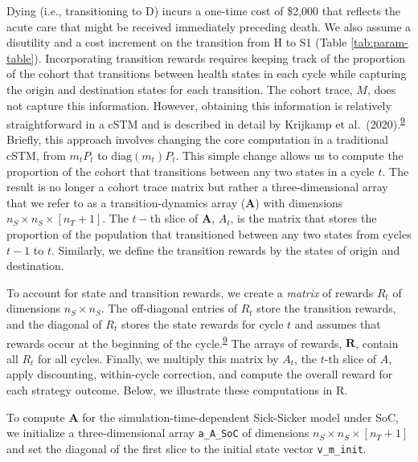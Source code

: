 \documentclass[
]{article}
\begin{document}
Dying (i.e., transitioning to D) incurs a one-time cost of \$2,000 that reflects the acute care that might be received immediately preceding death. We also assume a disutility and a cost increment on the transition from H to S1 (Table \ref{tab:param-table}). Incorporating transition rewards requires keeping track of the proportion of the cohort that transitions between health states in each cycle while capturing the origin and destination states for each transition. The cohort trace, \(M\), does not capture this information. However, obtaining this information is relatively straightforward in a cSTM and is described in detail by Krijkamp et al.~(2020).\textsuperscript{\protect\hyperlink{ref-Krijkamp2019}{9}} Briefly, this approach involves changing the core computation in a traditional cSTM, from \(m_t P_t\) to \(\text{diag}(m_t) P_t\). This simple change allows us to compute the proportion of the cohort that transitions between any two states in a cycle \(t\). The result is no longer a cohort trace matrix but rather a three-dimensional array that we refer to as a transition-dynamics array (\(\mathbf{A}\)) with dimensions \(n_S \times n_S \times [n_T+1]\). The \(t-\)th slice of \(\mathbf{A}\), \(A_t\), is the matrix that stores the proportion of the population that transitioned between any two states from cycles \(t-1\) to \(t\). Similarly, we define the transition rewards by the states of origin and destination.

To account for state and transition rewards, we create a \emph{matrix} of rewards \(R_t\) of dimensions \(n_S \times n_S\). The off-diagonal entries of \(R_t\) store the transition rewards, and the diagonal of \(R_t\) stores the state rewards for cycle \(t\) and assumes that rewards occur at the beginning of the cycle.\textsuperscript{\protect\hyperlink{ref-Krijkamp2019}{9}} The arrays of rewards, \(\mathbf{R}\), contain all \(R_t\) for all cycles. Finally, we multiply this matrix by \(A_t\), the \(t\)-th slice of \(A\), apply discounting, within-cycle correction, and compute the overall reward for each strategy outcome. Below, we illustrate these computations in R.

To compute \(\mathbf{A}\) for the simulation-time-dependent Sick-Sicker model under SoC, we initialize a three-dimensional array \texttt{a\_A\_SoC} of dimensions \(n_S \times n_S \times [n_T+1]\) and set the diagonal of the first slice to the initial state vector \texttt{v\_m\_init}.
\end{document}
